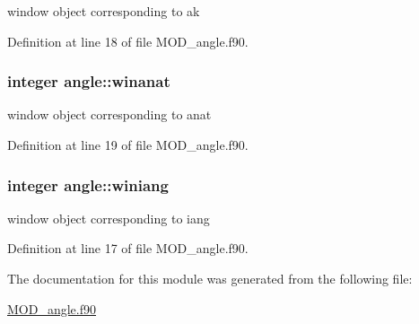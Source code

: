 window object corresponding to ak 



Definition at line 18 of file M\-O\-D\-\_\-angle.\-f90.

\hypertarget{classangle_a29408b2de55b5b467872218f68b45bf6}{
\subsubsection[{winanat}]{\setlength{\rightskip}{0pt plus 5cm}integer angle\-::winanat}}\label{classangle_a29408b2de55b5b467872218f68b45bf6}


window object corresponding to anat 



Definition at line 19 of file M\-O\-D\-\_\-angle.\-f90.

\hypertarget{classangle_a68986d70390a9e829c333cc9abfb035b}{
\subsubsection[{winiang}]{\setlength{\rightskip}{0pt plus 5cm}integer angle\-::winiang}}\label{classangle_a68986d70390a9e829c333cc9abfb035b}


window object corresponding to iang 



Definition at line 17 of file M\-O\-D\-\_\-angle.\-f90.



The documentation for this module was generated from the following file\-:\begin{DoxyCompactItemize}
\item 
\hyperlink{MOD__angle_8f90}{M\-O\-D\-\_\-angle.\-f90}\end{DoxyCompactItemize}
